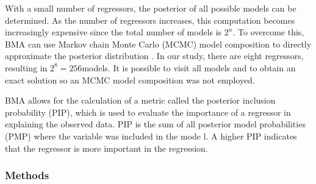 \documentclass[12pt]{article}
\begin{document}
With a small number of regressors, the posterior of all possible models can be determined. As the number of regressors increases, this computation becomes increasingly expensive since the total number of models is $2^n$. To overcome this, BMA can use Markov chain Monte Carlo (MCMC) model composition to directly approximate the posterior distribution \citep{Wasserman2000}. In our study, there are eight regressors, resulting in $2^8 = 256$models. It is possible to visit all models and to obtain an exact solution so an MCMC model composition was not employed. 

BMA allows for the calculation of a metric called the posterior inclusion probability (PIP), which is used to evaluate the importance of a regressor in explaining the observed data. PIP is the sum of all posterior model probabilities (PMP) where the variable was included in the mode \citep{Zeugner2015}l. A higher PIP indicates that the regressor is more important in the regression.  

\subsubsection{Methods}
\end{document}
